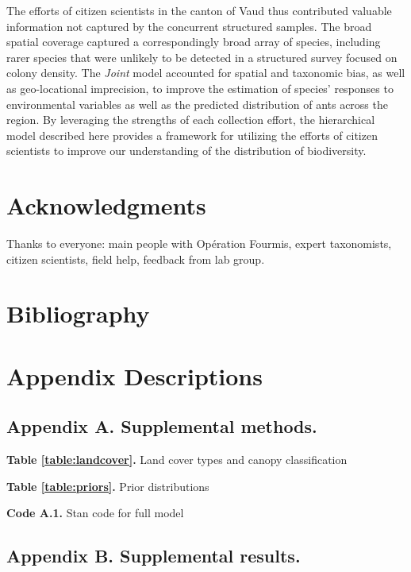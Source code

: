\documentclass[preprint,final,times,12pt,3p]{elsarticle}
\begin{document}
The efforts of citizen scientists in the canton of Vaud thus contributed valuable information not captured by the concurrent structured samples. The broad spatial coverage captured a correspondingly broad array of species, including rarer species that were unlikely to be detected in a structured survey focused on colony density. The \emph{Joint} model accounted for spatial and taxonomic bias, as well as geo-locational imprecision, to improve the estimation of species' responses to environmental variables as well as the predicted distribution of ants across the region. By leveraging the strengths of each collection effort, the hierarchical model described here provides a framework for utilizing the efforts of citizen scientists to improve our understanding of the distribution of biodiversity.




\section{Acknowledgments}
Thanks to everyone: main people with Opération Fourmis, expert taxonomists, citizen scientists, field help, feedback from lab group.

\newpage
\section{Bibliography}




\newpage
\section{Appendix Descriptions}

\subsection{Appendix A. Supplemental methods.}

\textbf{Table \ref{table:landcover}.} Land cover types and canopy classification

\textbf{Table \ref{table:priors}.} Prior distributions

\textbf{Code A.1.} Stan code for full model



\subsection{Appendix B. Supplemental results.}
\end{document}
